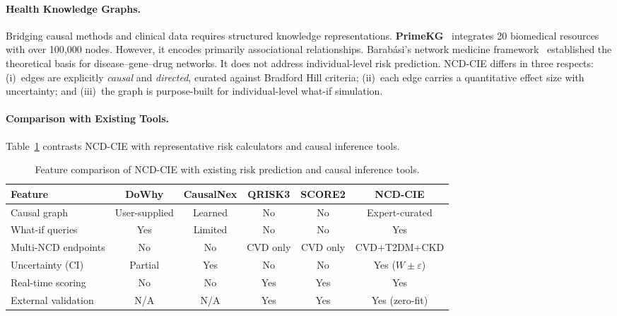 \documentclass[runningheads]{llncs}
\begin{document}
\paragraph{Health Knowledge Graphs.}
Bridging causal methods and clinical data requires structured
knowledge representations.
\textbf{PrimeKG}~\cite{chandak2023primekg} integrates 20 biomedical
resources with over 100{,}000 nodes.
However, it encodes primarily associational relationships.
Barab\'{a}si's network medicine
framework~\cite{barabasi2011network} established the theoretical
basis for disease--gene--drug networks.
It does not address individual-level risk prediction.
NCD-CIE differs in three respects:
(i)~edges are explicitly \emph{causal} and \emph{directed}, curated
against Bradford Hill criteria;
(ii)~each edge carries a quantitative effect size with uncertainty;
and (iii)~the graph is purpose-built for individual-level what-if
simulation.

\paragraph{Comparison with Existing Tools.}
Table~\ref{tab:toolcomp} contrasts NCD-CIE with representative risk
calculators and causal inference tools.

\renewcommand{\arraystretch}{1.2}
\begin{table}[t]
\centering
\caption{Feature comparison of NCD-CIE with existing risk prediction
and causal inference tools.}\label{tab:toolcomp}
\small
\begin{tabular}{@{}lccccc@{}}
\toprule
\textbf{Feature} & \textbf{DoWhy} & \textbf{CausalNex} &
\textbf{QRISK3} & \textbf{SCORE2} & \textbf{NCD-CIE} \\
\midrule
Causal graph        & User-supplied & Learned & No  & No  & Expert-curated \\
What-if queries     & Yes & Limited & No  & No  & Yes \\
Multi-NCD endpoints & No  & No      & CVD only & CVD only & CVD+T2DM+CKD \\
Uncertainty (CI)    & Partial & Yes & No  & No  & Yes ($W\!\pm\!\varepsilon$) \\
Real-time scoring   & No  & No      & Yes & Yes & Yes \\
External validation & N/A & N/A     & Yes & Yes & Yes (zero-fit) \\
\bottomrule
\end{tabular}
\end{table}
\renewcommand{\arraystretch}{1.0}
\end{document}
